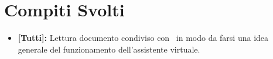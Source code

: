 \documentclass[../verbale-2016-12-19.tex]{subfiles}
\begin{document}
	\section{Compiti Svolti}
	\begin{itemize}
		\item \textbf{[Tutti]:} Lettura documento condiviso con \prop\ in modo da farsi una idea generale del funzionamento dell'assistente virtuale.
	\end{itemize}
\end{document}
